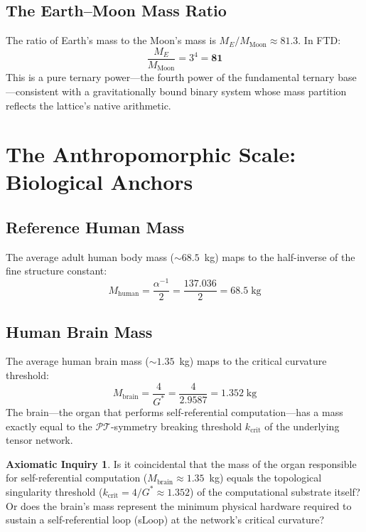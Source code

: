 \documentclass[11pt, letterpaper]{article}
\newcommand{\G}{G^*}
\newcommand{\PT}{\mathcal{PT}}
\theoremstyle{definition}
\newtheorem{inquiry}{Axiomatic Inquiry}[section]
\theoremstyle{remark}
\begin{document}
\subsection{The Earth--Moon Mass Ratio}

The ratio of Earth's mass to the Moon's mass is $M_E / M_{\text{Moon}} \approx 81.3$. In FTD:
\begin{equation}
    \frac{M_E}{M_{\text{Moon}}} = 3^4 = \mathbf{81}
\end{equation}
This is a pure ternary power---the fourth power of the fundamental ternary base---consistent with a gravitationally bound binary system whose mass partition reflects the lattice's native arithmetic.

\section{The Anthropomorphic Scale: Biological Anchors}

\subsection{Reference Human Mass}

The average adult human body mass ($\sim 68.5$~kg) maps to the half-inverse of the fine structure constant:
\begin{equation}
    M_{\text{human}} = \frac{\alpha^{-1}}{2} = \frac{137.036}{2} = \mathbf{68.5}\;\text{kg}
\end{equation}

\subsection{Human Brain Mass}

The average human brain mass ($\sim 1.35$~kg) maps to the critical curvature threshold:
\begin{equation}
    M_{\text{brain}} = \frac{4}{\G} = \frac{4}{2.9587} = \mathbf{1.352}\;\text{kg}
\end{equation}
The brain---the organ that performs self-referential computation---has a mass exactly equal to the $\PT$-symmetry breaking threshold $k_{\text{crit}}$ of the underlying tensor network.

\begin{inquiry}
Is it coincidental that the mass of the organ responsible for self-referential computation ($M_{\text{brain}} \approx 1.35$~kg) equals the topological singularity threshold ($k_{\text{crit}} = 4/\G \approx 1.352$) of the computational substrate itself? Or does the brain's mass represent the minimum physical hardware required to sustain a self-referential loop (sLoop) at the network's critical curvature?
\end{inquiry}
\end{document}
